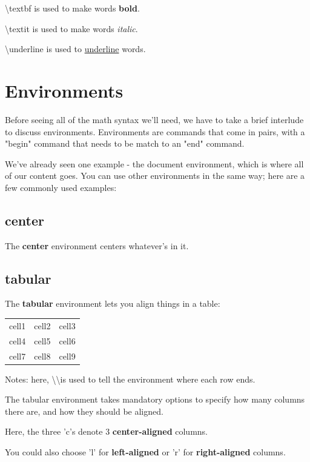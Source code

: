 \documentclass{article}
\begin{document}
    \textbackslash textbf{} is used to make words \textbf{bold}.
    
    \textbackslash textit{} is used to make words \textit{italic}.
    
    \textbackslash underline{} is used to \underline{underline} words.


\section{Environments}
    Before seeing all of the math syntax we'll need, we have to take a brief interlude to discuss environments. Environments are commands that come in pairs, with a "begin" command that needs to be match to an "end" command.
    
    We've already seen one example - the document environment, which is where all of our content goes. You can use other environments in the same way; here are a few commonly used examples:

    \subsection{center}
        \begin{center}
            The \textbf{center} environment centers whatever's in it.
        \end{center}
        
        \subsection{tabular}
        The \textbf{tabular} environment lets you align things in a table:
        \begin{tabular}{ c c c } 
          cell1 & cell2 & cell3 \\ 
          cell4 & cell5 & cell6 \\ 
          cell7 & cell8 & cell9 \\ 
        \end{tabular}

        Notes: here, \textbackslash\textbackslash is used to tell the environment where each row ends.
        
        The tabular environment takes mandatory options to specify how many columns there are, and how they should be aligned.
        
        Here, the three 'c's denote 3 \textbf{center-aligned} columns. 
        
        You could also choose 'l' for \textbf{left-aligned} or 'r' for \textbf{right-aligned} columns.
        
\end{document}

